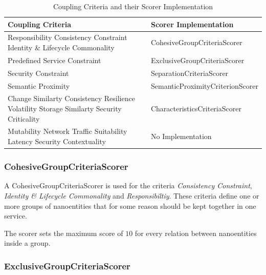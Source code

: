 \begin{table}[H]
	\centering
	\caption{Coupling Criteria and their Scorer Implementation}
	\label{tab:scorer}
	\begin{tabular}{|p{170pt}|p{200pt}|}
		\hline	
		\textbf{Coupling Criteria} & \textbf{Scorer Implementation}  \\
		\hline
		Responsibility \newline Consistency Constraint \newline Identity \& Lifecycle Commonality  & CohesiveGroupCriteriaScorer \\
		\hline
		Predefined Service Constraint  & ExclusiveGroupCriteriaScorer \\ 
		\hline
		Security Constraint & SeparationCriteriaScorer \\
		\hline
		Semantic Proximity & SemanticProximityCriterionScorer \\
		\hline
		Change Similarty \newline Consistency \newline Resilience \newline Volatility \newline Storage Similarty \newline Security Criticality & CharacteristicsCriteriaScorer  \\
		\hline
		Mutability \newline Network Traffic Suitability \newline Latency \newline Security Contextuality & No Implementation  \\
		\hline
	\end{tabular}
\end{table}

\subsubsection{CohesiveGroupCriteriaScorer}

A CohesiveGroupCriteriaScorer is used for the criteria \textit{Consistency Constraint}, \textit{Identity \& Lifecycle Commonality} and \textit{Responsibiltiy}. These criteria define one or more groups of nanoentities that for some reason should be kept together in one service.

The scorer sets the maximum score of $10$ for every relation between nanoentities inside a group. 

\subsubsection{ExclusiveGroupCriteriaScorer}

